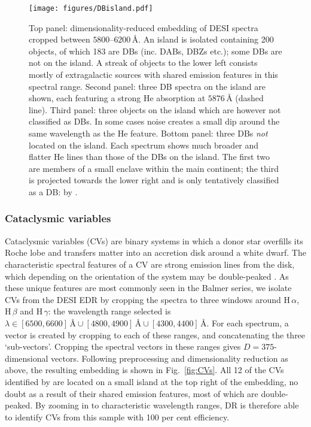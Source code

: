 \documentclass[fleqn,usenatbib]{mnras}
\begin{document}
\begin{figure}
\centering
\texttt{[image: figures/DBisland.pdf]}
\caption{
    Top panel: dimensionality-reduced embedding of DESI spectra cropped between $5800$--$6200\,\text{\AA}$.
    An island is isolated containing 200 objects, of which 183 are DBs (inc. DABs, DBZs etc.); some DBs are not on the island.
    A streak of objects to the lower left consists mostly of extragalactic sources with shared emission features in this spectral range.
    Second panel: three DB spectra on the island are shown, each featuring a strong He absorption at $5876\,\text{\AA}$ (dashed line).
    Third panel: three objects on the island which are however not classified as DBs.
    In some cases noise creates a small dip around the same wavelength as the He feature.
    Bottom panel: three DBs \textit{not} located on the island.
    Each spectrum shows much broader and flatter He lines than those of the DBs on the island.
    The first two are members of a small enclave within the main continent; the third is projected towards the lower right and is only tentatively classified as a DB: by \citet{manser24}.
}
\label{fig:He_lines}
\end{figure}

\subsubsection{Cataclysmic variables}
\label{sec:CVs}

Cataclysmic variables (CVs) are binary systems in which a donor star overfills its Roche lobe and transfers matter into an accretion disk around a white dwarf.
The characteristic spectral features of a CV are strong emission lines from the disk, which depending on the orientation of the system may be double-peaked \citep{smak69, huang72}.
As these unique features are most commonly seen in the Balmer series, we isolate CVs from the DESI EDR by cropping the spectra to three windows around H$\,\alpha$, H$\,\beta$ and H$\,\gamma$:
the wavelength range selected is $\lambda \in [6500, 6600]\,\text{\AA} \cup [4800, 4900]\,\text{\AA} \cup [4300, 4400]\,\text{\AA}$.
For each spectrum, a vector is created by cropping to each of these ranges, and concatenating the three `sub-vectors'.
Cropping the spectral vectors in these ranges gives $D=375$-dimensional vectors.
Following preprocessing and dimensionality reduction as above, the resulting embedding is shown in Fig.~\ref{fig:CVs}.
All 12 of the CVs identified by \citet{manser24} are located on a small island at the top right of the embedding, no doubt as a result of their shared emission features, most of which are double-peaked.
By zooming in to characteristic wavelength ranges, DR is therefore able to identify CVs from this sample with 100 per cent efficiency.
\end{document}
